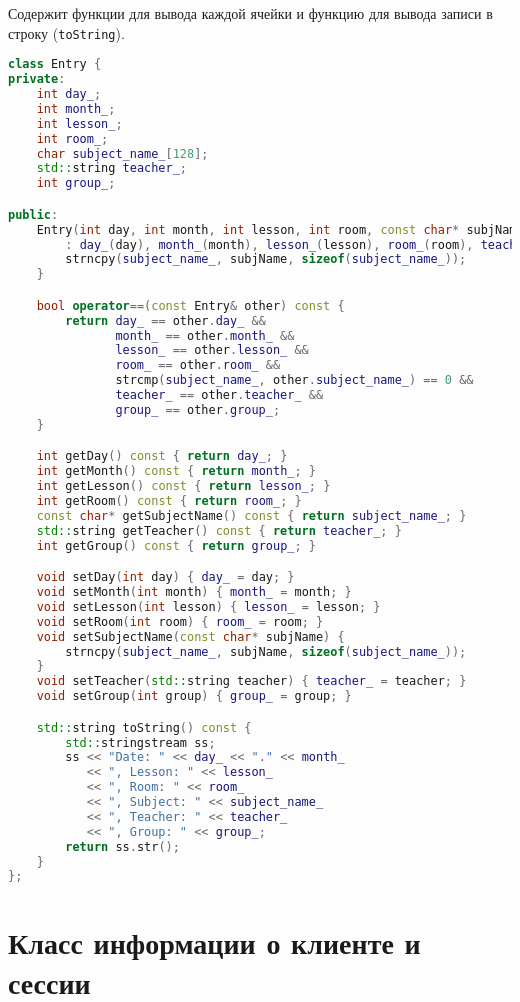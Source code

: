 \documentclass{article}
\begin{document}
Содержит функции для вывода каждой ячейки и функцию для вывода записи в строку (\texttt{toString}).

\begin{lstlisting}[language=C++]
class Entry {
private:
    int day_;
    int month_;
    int lesson_;
    int room_;
    char subject_name_[128];
    std::string teacher_;
    int group_;

public:
    Entry(int day, int month, int lesson, int room, const char* subjName, std::string teacher, int group)
        : day_(day), month_(month), lesson_(lesson), room_(room), teacher_(teacher), group_(group) {
        strncpy(subject_name_, subjName, sizeof(subject_name_));
    }

    bool operator==(const Entry& other) const {
        return day_ == other.day_ &&
               month_ == other.month_ &&
               lesson_ == other.lesson_ &&
               room_ == other.room_ &&
               strcmp(subject_name_, other.subject_name_) == 0 &&
               teacher_ == other.teacher_ &&
               group_ == other.group_;
    }

    int getDay() const { return day_; }
    int getMonth() const { return month_; }
    int getLesson() const { return lesson_; }
    int getRoom() const { return room_; }
    const char* getSubjectName() const { return subject_name_; }
    std::string getTeacher() const { return teacher_; }
    int getGroup() const { return group_; }

    void setDay(int day) { day_ = day; }
    void setMonth(int month) { month_ = month; }
    void setLesson(int lesson) { lesson_ = lesson; }
    void setRoom(int room) { room_ = room; }
    void setSubjectName(const char* subjName) {
        strncpy(subject_name_, subjName, sizeof(subject_name_));
    }
    void setTeacher(std::string teacher) { teacher_ = teacher; }
    void setGroup(int group) { group_ = group; }

    std::string toString() const {
        std::stringstream ss;
        ss << "Date: " << day_ << "." << month_
           << ", Lesson: " << lesson_
           << ", Room: " << room_
           << ", Subject: " << subject_name_
           << ", Teacher: " << teacher_
           << ", Group: " << group_;
        return ss.str();
    }
};
\end{lstlisting}

\section*{Класс информации о клиенте и сессии}
\end{document}
